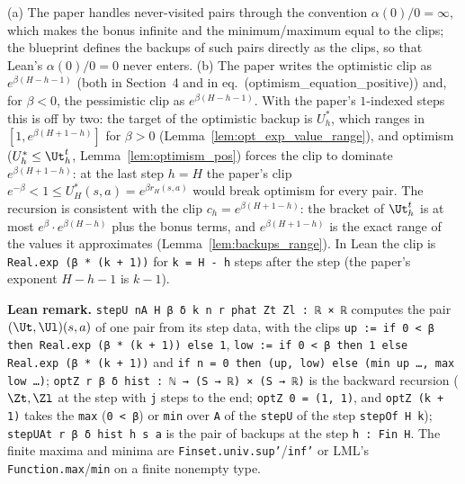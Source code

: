 \begin{remark}\label{rem:algorithm_clips}
(a) The paper handles never-visited pairs through the convention $\alpha(0)/0 = \infty$, which
makes the bonus infinite and the minimum/maximum equal to the clips; the blueprint defines the
backups of such pairs directly as the clips, so that Lean's $\alpha(0)/0 = 0$ never enters.
(b) The paper writes the optimistic clip as $e^{\beta(H - h - 1)}$ (both in Section~4 and in
eq.~(optimism\_equation\_positive)) and, for $\beta < 0$, the pessimistic clip as
$e^{\beta(H - h - 1)}$. With the paper's $1$-indexed steps this is off by two: the target of the
optimistic backup is $U^*_h$, which ranges in $[1, e^{\beta(H + 1 - h)}]$ for $\beta > 0$
(Lemma~\ref{lem:opt_exp_value_range}), and optimism ($U^*_h \le \Ut^t_h$, Lemma~\ref{lem:optimism_pos})
forces the clip to dominate $e^{\beta(H + 1 - h)}$: at the last step $h = H$ the paper's clip
$e^{-\beta} < 1 \le U^*_H(s, a) = e^{\beta r_H(s, a)}$ would break optimism for every pair. The
recursion is consistent with the clip $c_h = e^{\beta(H + 1 - h)}$: the bracket of $\Ut^t_h$ is
at most $e^{\beta}\cdot e^{\beta(H - h)}$ plus the bonus terms, and $e^{\beta(H + 1 - h)}$ is the
exact range of the values it approximates (Lemma~\ref{lem:backups_range}). In Lean the clip is
\texttt{Real.exp (β * (k + 1))} for \texttt{k = H - h} steps after the step (the paper's
exponent $H - h - 1$ is $k - 1$).
\end{remark}

\textbf{Lean remark.} \texttt{stepU nA H β δ k n r phat Zt Zl : ℝ × ℝ} computes the pair
$(\Ut, \Ul)(s, a)$ of one pair from its step data, with the clips
\texttt{up := if 0 < β then Real.exp (β * (k + 1)) else 1},
\texttt{low := if 0 < β then 1 else Real.exp (β * (k + 1))} and \texttt{if n = 0 then (up, low) else (min up …, max low …)};
\texttt{optZ r β δ hist : ℕ → (S → ℝ) × (S → ℝ)} is the backward recursion
($\Zt, \Zl$ at the step with \texttt{j} steps to the end; \texttt{optZ 0 = (1, 1)}, and
\texttt{optZ (k + 1)} takes the \texttt{max} (\texttt{0 < β}) or \texttt{min} over
\texttt{A} of the \texttt{stepU} of the step \texttt{stepOf H k}); \texttt{stepUAt r β δ hist h s a}
is the pair of backups at the step \texttt{h : Fin H}. The finite maxima and minima are
\texttt{Finset.univ.sup'}/\texttt{inf'} or LML's \texttt{Function.max}/\texttt{min} on a
finite nonempty type.

